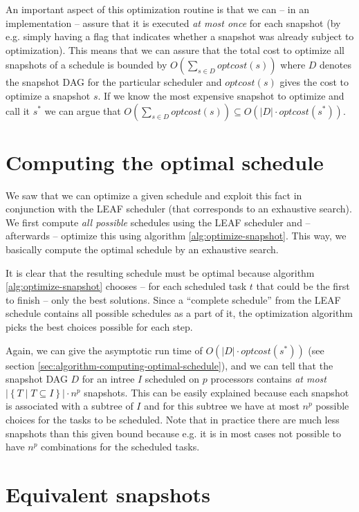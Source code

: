 An important aspect of this optimization routine is that we can -- in an implementation -- assure that it is executed \emph{at most once} for each snapshot (by e.g. simply having a flag that indicates whether a snapshot was already subject to optimization). This means that we can assure that the total cost to optimize all snapshots of a schedule is bounded by $O\left(\sum_{s\in D} optcost(s)\right)$ where $D$ denotes the snapshot DAG for the particular scheduler and $optcost(s)$ gives the cost to optimize a snapshot $s$. If we know the most expensive snapshot to optimize and call it $s^*$ we can argue that $O\left(\sum_{s\in D} optcost(s)\right) \subseteq O\left(|D|\cdot optcost(s^*)\right)$.

\section{Computing the optimal schedule}
\label{sec:intro-computing-optimal-schedule}

We saw that we can optimize a given schedule and exploit this fact in conjunction with the LEAF scheduler (that corresponds to an exhaustive search). We first compute \emph{all possible} schedules using the LEAF scheduler and -- afterwards -- optimize this using algorithm \ref{alg:optimize-snapshot}. This way, we basically compute the optimal schedule by an exhaustive search.

It is clear that the resulting schedule must be optimal because algorithm \ref{alg:optimize-snapshot} chooses -- for each scheduled task $t$ that could be the first to finish -- only the best solutions. Since a ``complete schedule'' from the LEAF schedule contains all possible schedules as a part of it, the optimization algorithm picks the best choices possible for each step.

Again, we can give the asymptotic run time of $O\left(|D| \cdot optcost(s^*)\right)$ (see section \ref{sec:algorithm-computing-optimal-schedule}), and we can tell that the snapshot DAG $D$ for an intree $I$ scheduled on $p$ processors contains \emph{at most} $| \left\{ T \mid T\subseteq I \right\} | \cdot n^p$ snapshots. This can be easily explained because each snapshot is associated with a subtree of $I$ and for this subtree we have at most $n^p$ possible choices for the tasks to be scheduled. Note that in practice there are much less snapshots than this given bound because e.g. it is in most cases not possible to have $n^p$ combinations for the scheduled tasks.

\section{Equivalent snapshots}
\label{sec:intro-first-glance-schedules}

